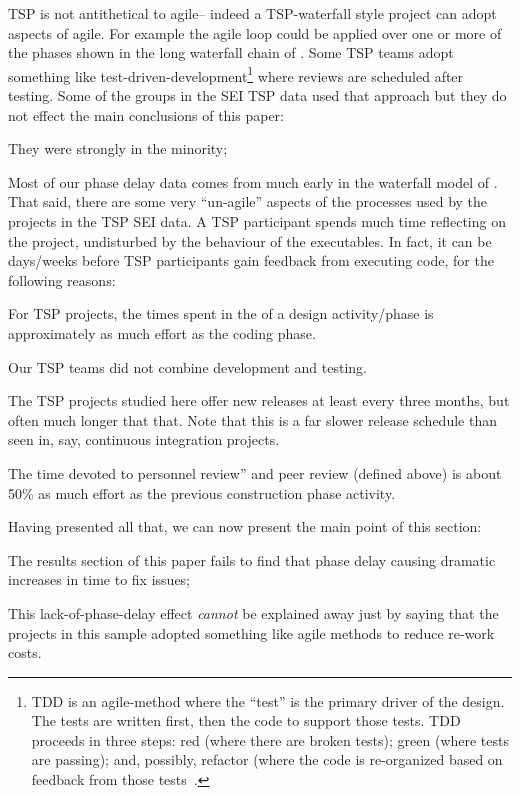 TSP is not antithetical to agile--  indeed a TSP-waterfall style project can adopt aspects
of agile.  For example the agile loop  could be applied
over one or more of the phases shown in the long waterfall chain of . Some
TSP teams adopt something like test-driven-development\footnote{TDD is an agile-method
where the ``test'' is the primary driver of the design. The tests are written first,
then the code to support those tests. TDD proceeds in three steps: red (where there
are broken tests); green (where tests are passing); and, possibly, refactor (where
the code is re-organized based on feedback from those tests~\cite{fraser03}.} where
reviews are scheduled after testing. Some of the groups in the SEI TSP data used that approach but
they do not effect the main conclusions of this paper:
\bi 
\item They were strongly in the minority;
\item Most of our phase delay data comes from much early in the waterfall model
of .
\ei 
That said, there are some very ``un-agile'' aspects
of the processes used by the   projects in the TSP SEI data.
A TSP participant spends much time reflecting on the project,
undisturbed by the behaviour of the  executables.
In fact,
it can be days/weeks
before TSP participants gain  feedback from executing code, for the following reasons:  
\bi 
\item
For TSP projects, the times spent in the of a design activity/phase is   
approximately as much effort as the coding phase.  
\item Our TSP teams did not
 combine development and  testing. 
 \item  The TSP projects studied here offer new releases at least every three months, but
often much longer that that. Note that this is a far slower
release schedule than seen in, say, continuous integration projects.  
\item The time devoted to personnel review'' and peer review (defined above)
is  about 50\% as much effort as the previous construction phase activity.
 
\ei

Having presented all that, we can now present the main point of this section:
\bi 
\item The results section of this paper fails to find that  phase delay causing dramatic increases
in time to fix issues;
\item This lack-of-phase-delay effect {\em cannot} be explained away just by  saying that
the projects in this sample adopted something like  agile methods to reduce re-work costs.
\ei  